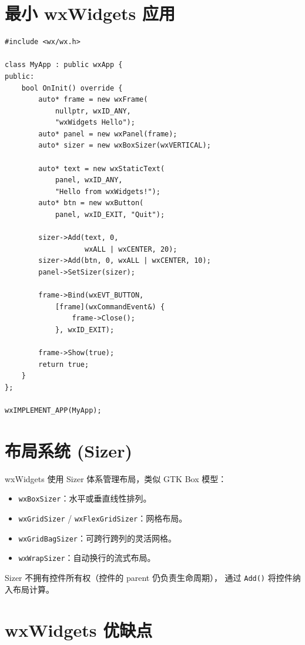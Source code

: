 \documentclass[12pt,a4paper,fontset=fandol]{ctexbook}
\newcommand{\cpplabel}{%
  \tcbox[on line,colback=cppheadbg,colframe=cppheadbg,
    boxrule=0pt,arc=1pt,left=2pt,right=2pt,top=1pt,bottom=1pt,
    colupper=white,fontupper=\scriptsize\bfseries]{C++}}
\newcommand{\Fn}[1]{\texttt{#1()}}
\newcommand{\Tp}[1]{\texttt{#1}}
\begin{document}
\section{最小 wxWidgets 应用}

\cpplabel
\begin{lstlisting}[style=cppstyle]
#include <wx/wx.h>

class MyApp : public wxApp {
public:
    bool OnInit() override {
        auto* frame = new wxFrame(
            nullptr, wxID_ANY,
            "wxWidgets Hello");
        auto* panel = new wxPanel(frame);
        auto* sizer = new wxBoxSizer(wxVERTICAL);

        auto* text = new wxStaticText(
            panel, wxID_ANY,
            "Hello from wxWidgets!");
        auto* btn = new wxButton(
            panel, wxID_EXIT, "Quit");

        sizer->Add(text, 0,
                   wxALL | wxCENTER, 20);
        sizer->Add(btn, 0, wxALL | wxCENTER, 10);
        panel->SetSizer(sizer);

        frame->Bind(wxEVT_BUTTON,
            [frame](wxCommandEvent&) {
                frame->Close();
            }, wxID_EXIT);

        frame->Show(true);
        return true;
    }
};

wxIMPLEMENT_APP(MyApp);
\end{lstlisting}

\section{布局系统 (Sizer)}

wxWidgets 使用 Sizer 体系管理布局，类似 GTK Box 模型：

\begin{itemize}
  \item \Tp{wxBoxSizer}：水平或垂直线性排列。
  \item \Tp{wxGridSizer} / \Tp{wxFlexGridSizer}：网格布局。
  \item \Tp{wxGridBagSizer}：可跨行跨列的灵活网格。
  \item \Tp{wxWrapSizer}：自动换行的流式布局。
\end{itemize}

Sizer 不拥有控件所有权（控件的 parent 仍负责生命周期），
通过 \Fn{Add} 将控件纳入布局计算。

\section{wxWidgets 优缺点}
\end{document}
